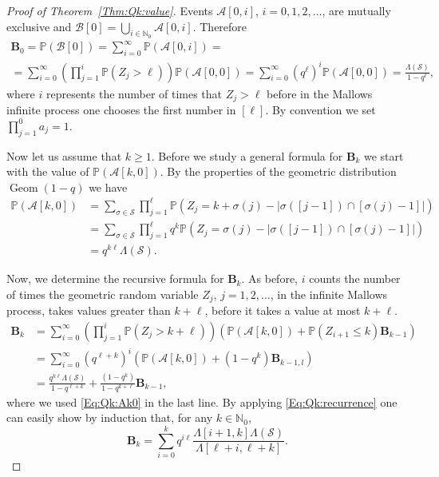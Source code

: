 \documentclass[10pt,a4paper]{amsart}
\newcommand{\NN}{\mathbb{N}}
\newcommand{\Pra}[1]{\mathbb{P}\left(#1\right)}
\newcommand{\bB}{\mathbf{B}}
\newcommand{\bN}{\mathbb{N}}
\newcommand{\cA}{\mathcal{A}}
\newcommand{\cB}{\mathcal{B}}
\newcommand{\cS}{\mathcal{S}}
\renewcommand{\ge}{\geqslant}
\renewcommand{\le}{\leqslant}
\newcommand{\product}{\Lambda}
\newcommand{\productO}{\Lambda(\cS)}
\begin{document}
\begin{proof}[Proof of Theorem~\ref{Thm:Qk:value}]
	
	Events $\cA[0,i]$, $i=0,1,2,\ldots$, are mutually exclusive and $\cB[0]=\bigcup_{i\in \NN_0}\cA[0,i]$. Therefore
	\begin{multline}\label{Eq:Q0}
		\bB_{0}=\Pra{\cB[0]}=\sum_{i=0}^{\infty}\Pra{\cA[0,i]}=\\=\sum_{i=0}^{\infty}\left(\prod_{j=1}^{i}\Pra{Z_j>\ell}\right)\Pra{\cA[0,0]}
		=\sum_{i=0}^{\infty}(q^\ell)^i\Pra{\cA[0,0]}=\frac{\productO}{1-q^\ell},
	\end{multline}
	where $i$ represents the number of times that $Z_j>\ell$ before in the Mallows infinite process one chooses the first number in $[\ell]$. By convention we set $\prod_{j=1}^0a_j=1$.
	
	Now let us assume that $k\ge 1$.
	Before we study a general formula for $\bB_{k}$ we start with the value of $\Pra{\cA[k,0]}$. By the properties of the geometric distribution $\operatorname{Geom}(1-q)$ we have 
	\begin{equation}\label{Eq:Qk:Ak0}
		\begin{split}
			\Pra{\cA[k,0]}
			&=\sum_{\sigma\in \cS}\prod_{j=1}^{\ell}\Pra{Z_j=k+\sigma(j)-|\sigma([j-1])\cap [\sigma(j)-1]|}\\
			&=\sum_{\sigma\in \cS}\prod_{j=1}^{\ell}q^k\Pra{Z_j=\sigma(j)-|\sigma([j-1])\cap [\sigma(j)-1]|}\\
			&=q^{k\ell}\productO.
		\end{split}
	\end{equation}
	
	Now, we determine the recursive formula for $\bB_{k}$. As before, $i$ counts the number of times the geometric random variable $Z_j$, $j=1,2,\ldots$, in the infinite Mallows process, takes values greater than $k+\ell$, before it takes a value at most $k+\ell$.
	\begin{align}\nonumber
		\bB_{k}
		&=\sum_{i=0}^{\infty}\left(\prod_{j=1}^{i}\Pra{Z_j>k+\ell}\right)\left(\Pra{\cA[k,0]}+\Pra{Z_{i+1}\le k}\bB_{k-1}\right)\\
		\nonumber
		&=\sum_{i=0}^{\infty}(q^{\ell+k})^i\left(\Pra{\cA[k,0]}+(1-q^k)\bB_{k-1,l}\right)\\
		\label{Eq:Qk:recurrence}
		&=\frac{q^{k\ell}\productO}{1-q^{\ell+k}}+\frac{(1-q^k)}{1-q^{k+\ell}}\bB_{k-1},
	\end{align} 
	where we used \eqref{Eq:Qk:Ak0} in the last line.
	By applying \eqref{Eq:Qk:recurrence} one can easily show by induction that, for any $k\in \bN_0$,
	\begin{equation}\label{Eq:Qk:Sum0}
		\bB_{k}=\sum_{i=0}^k q^{i\ell}\frac{\product[i+1,k]\productO}{\product[\ell+i,\ell+k]}.
	\end{equation}
	

\end{proof}
\end{document}
